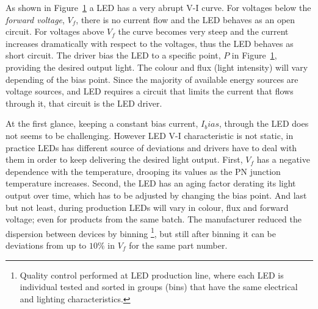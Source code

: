 As shown in Figure~\ref{fig:led_I-V} a LED has a very abrupt V-I curve. For voltages below the \emph{forward voltage}, $V_{f}$, there is no current flow and the LED behaves as an open circuit. For voltages above $V_{f}$ the curve becomes very steep and the current increases dramatically with respect to the voltages, thus the LED behaves as short circuit. The driver bias the LED to a specific point, $P$ in Figure~\ref{fig:led_I-V}, providing the desired output light. The colour and flux (light intensity) will vary depending of the bias point.  Since the majority of  available  energy sources are  voltage sources, and LED requires a circuit that limits the current that flows through it, that circuit is the LED driver.

\begin{figure}[!h]
\centering
{}
\caption {}
\label{fig:led_I-V}
\end{figure}

At the first glance, keeping a constant bias current, $I_bias$, through the LED does not seems to be challenging. However LED V-I characteristic is not static, in practice LEDs has different source of deviations and drivers have to deal with them in order to keep delivering the desired light output. First, $V_f$ has a negative dependence with the temperature, drooping its values as the PN junction temperature increases. Second, the LED has an aging factor derating its light output over time, which has to be adjusted by changing the bias point. And last but not least, during production LEDs will vary in colour, flux and forward voltage; even for products from the same batch. The manufacturer reduced the dispersion between devices by binning \footnote{Quality control performed at LED production line, where each LED is individual tested and sorted in groups (bins) that have the same electrical and lighting characteristics.}, but still after binning it can be deviations from up to $10\%$ in $V_f$ for the same part number.

